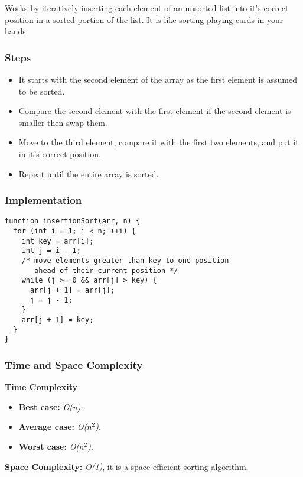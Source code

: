 Works by iteratively inserting each element of an unsorted list into it's correct position in a sorted portion of the list. It is like sorting playing cards in your hands.

\subsubsection*{Steps}

\begin{itemize}
  \item It starts with the second element of the array as the first element is assumed to be sorted.
  \item Compare the second element with the first element if the second element is smaller then swap them.
  \item Move to the third element, compare it with the first two elements, and put it in it's correct position.
  \item Repeat until the entire array is sorted.
\end{itemize}

\subsubsection*{Implementation}

\begin{lstlisting}[style=general]
function insertionSort(arr, n) {
  for (int i = 1; i < n; ++i) {
    int key = arr[i];
    int j = i - 1;
    /* move elements greater than key to one position
       ahead of their current position */
    while (j >= 0 && arr[j] > key) {
      arr[j + 1] = arr[j];
      j = j - 1;
    }
    arr[j + 1] = key;
  }
}
\end{lstlisting}

\subsubsection*{Time and Space Complexity}

\textbf{Time Complexity}

\begin{itemize}
  \item \textbf{Best case:} \textit{O(n)}.
  \item \textbf{Average case:} \emph{O($n^2$)}.
  \item \textbf{Worst case:} \textit{O($n^2$)}.
\end{itemize}

\textbf{Space Complexity:} \textit{O(1)}, it is a space-efficient sorting algorithm.

